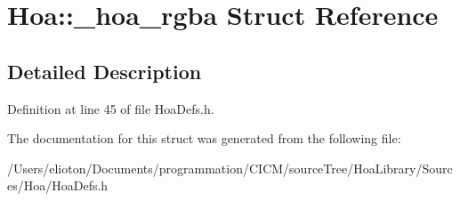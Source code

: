 \hypertarget{struct_hoa_1_1__hoa__rgba}{\section{Hoa\-:\-:\-\_\-hoa\-\_\-rgba Struct Reference}
\label{struct_hoa_1_1__hoa__rgba}
}


\subsection{Detailed Description}


Definition at line 45 of file Hoa\-Defs.\-h.



The documentation for this struct was generated from the following file\-:\begin{DoxyCompactItemize}
\item 
/\-Users/elioton/\-Documents/programmation/\-C\-I\-C\-M/source\-Tree/\-Hoa\-Library/\-Sources/\-Hoa/Hoa\-Defs.\-h\end{DoxyCompactItemize}
